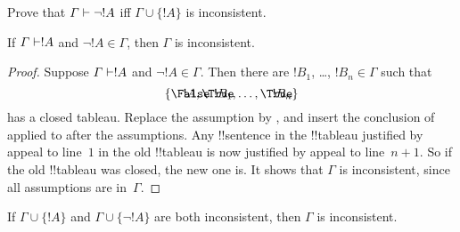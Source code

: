 \documentclass[../../../include/open-logic-section]{subfiles}
\begin{document}
\begin{prob}
Prove that $\Gamma \Proves \lnot !A$ iff $\Gamma \cup \{!A\}$ is inconsistent.
\end{prob}

\begin{prop}
  If $\Gamma \Proves !A$ and $\lnot !A \in \Gamma$, then $\Gamma$ is
  inconsistent.
\end{prop}

\begin{proof}
  Suppose $\Gamma \Proves !A$ and $\lnot !A \in \Gamma$.  Then there
  are $!B_1$, \dots, $!B_n \in \Gamma$ such that \
  \[
  \{\sFmla{\False}{!A}, \sFmla{\True}{!B_1}, \dots, \sFmla{\True}{!B_n}\}
  \]
  has a closed tableau. Replace the assumption  by
  \sFmla{\True}{\lnot !A}, and insert the conclusion of
  \TRule{\True}{\lnot} applied to \sFmla{\False}{!A} after the
  assumptions. Any !!{sentence} in the !!{tableau} justified by appeal
  to line~$1$ in the old !!{tableau} is now justified by appeal to
  line~$n+1$. So if the old !!{tableau} was closed, the new one is.
  It shows that $\Gamma$ is inconsistent, since all assumptions are
  in~$\Gamma$.
\end{proof}

\begin{prop}
  If $\Gamma \cup \{!A\}$ and $\Gamma \cup \{\lnot !A\}$ are both
  inconsistent, then $\Gamma$ is inconsistent.
\end{prop}
\end{document}
